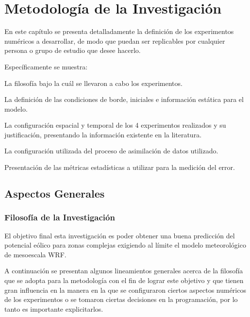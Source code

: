 \chapter{Metodología de la Investigación}
En este capítulo se presenta detalladamente la definición de los experimentos numéricos a desarrollar, de modo que puedan ser replicables por cualquier persona o grupo de estudio que desee hacerlo. 

Específicamente se muestra: 
\begin{itemize*}
	\item La filosofía bajo la cuál se llevaron a cabo los experimentos.
	\item La definición de las condiciones de borde, iniciales e información estática para el modelo.
	\item La configuración espacial y temporal de los 4 experimentos realizados y su justificación, presentando la información existente en la literatura.
	\item La configuración utilizada del proceso de asimilación de datos utilizado.
	\item Presentación de las métricas estadísticas a utilizar para la medición del error.
\end{itemize*}
\newpage
\section{Aspectos Generales}
\subsection{Filosofía de la Investigación}
El objetivo final esta investigación es poder obtener una buena predicción del potencial eólico para zonas complejas exigiendo al límite el modelo meteorológico de mesoescala WRF. 

A continuación se presentan algunos lineamientos generales acerca de la filosofía que se adopta para la metodología con el fin de lograr este objetivo y que tienen gran influencia en la manera en la que se configuraron ciertos aspectos numéricos de los experimentos o se tomaron ciertas decisiones en la programación, por lo tanto es importante explicitarlos.
